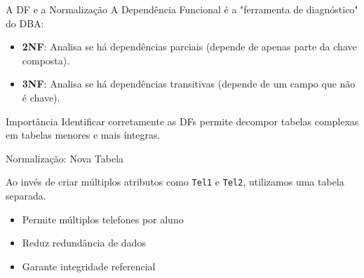 \documentclass[9pt]{beamer}
\begin{document}
\begin{frame}{A DF e a Normalização}
  A Dependência Funcional é a "ferramenta de diagnóstico" do DBA:
  \vspace{0.4cm}
  \begin{itemize}
    \item \textbf{2NF}: Analisa se há dependências parciais (depende de apenas parte da chave composta).
    \item \textbf{3NF}: Analisa se há dependências transitivas (depende de um campo que não é chave).
  \end{itemize}
  \vspace{0.4cm}
  \begin{exampleblock}{Importância}
    Identificar corretamente as DFs permite decompor tabelas complexas em tabelas menores e mais íntegras.
  \end{exampleblock}
\end{frame}
\begin{frame}{Normalização: Nova Tabela}

\small
Ao invés de criar múltiplos atributos como \texttt{Tel1} e \texttt{Tel2}, utilizamos uma tabela separada.

\vspace{0.5cm}

\centering
{}

\vspace{0.5cm}

\begin{itemize}
    \item Permite múltiplos telefones por aluno
    \item Reduz redundância de dados
    \item Garante integridade referencial
\end{itemize}

\end{frame}
\end{document}
